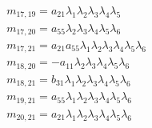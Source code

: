 \documentclass{article}
\begin{document}
\begin{align*}
&m_{17,19}=a_{21} \lambda_{1} \lambda_{2} \lambda_{3} \lambda_{4} \lambda_{5}\\
&m_{17,20}=a_{55} \lambda_{2} \lambda_{3} \lambda_{4} \lambda_{5} \lambda_{6}\\
&m_{17,21}=a_{21} a_{55} \lambda_{1} \lambda_{2} \lambda_{3} \lambda_{4} \lambda_{5} \lambda_{6}\\
&m_{18,20}=-a_{11} \lambda_{2} \lambda_{3} \lambda_{4} \lambda_{5} \lambda_{6}\\
&m_{18,21}=b_{31} \lambda_{1} \lambda_{2} \lambda_{3} \lambda_{4} \lambda_{5} \lambda_{6}\\
&m_{19,21}=a_{55} \lambda_{1} \lambda_{2} \lambda_{3} \lambda_{4} \lambda_{5} \lambda_{6}\\
&m_{20,21}=a_{21} \lambda_{1} \lambda_{2} \lambda_{3} \lambda_{4} \lambda_{5} \lambda_{6}\\
\end{align*}
\newpage
\end{document}
